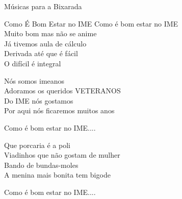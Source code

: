 \begin{secao}{Músicas para a Bixarada}
\begin{subsecao}{Como É Bom Estar no IME}
Como é bom estar no IME \\
Muito bom mas não se anime \\
Já tivemos aula de cálculo \\
Derivada até que é fácil \\
O difícil é integral

Nós somos imeanos \\
Adoramos os queridos VETERANOS \\
Do IME nós gostamos \\
Por aqui nós ficaremos muitos anos
 
Como é bom estar no IME....

Que porcaria é a poli \\
Viadinhos que não gostam de mulher \\
Bando de bundas-moles \\
A menina mais bonita tem bigode

Como é bom estar no IME....
\\
\\
\end{subsecao}
\end{secao}
